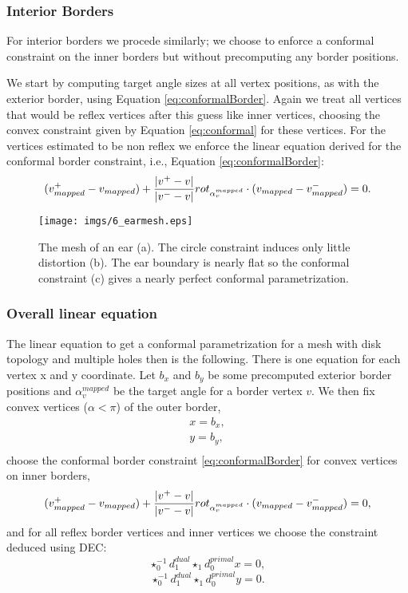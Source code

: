 \subsubsection{Interior Borders}
For interior borders we procede similarly; we choose to enforce a conformal constraint on the inner borders but without precomputing any border positions.

We start by computing target angle sizes at all vertex positions, as with the exterior border, using Equation \ref{eq:conformalBorder}. Again we treat all vertices that would be reflex vertices after this guess like inner vertices, choosing the convex constraint given by Equation \ref{eq:conformal} for these vertices.
For the vertices estimated to be non reflex we enforce the linear equation derived for the conformal border constraint, i.e., Equation \ref{eq:conformalBorder}:
\[(v^+_{mapped}-v_{mapped} ) + \frac{\left| v^+-v \right|}{\left| v^- -v \right|}rot_{\alpha_v^{mapped}} \cdot (v_{mapped} - v_{mapped}^- )= 0.\]

\begin{figure}%
\begin{center}
\texttt{[image: imgs/6\_earmesh.eps]}%
\end{center}
\caption{The mesh of an ear (a). The circle constraint induces only little distortion (b). The ear boundary is nearly flat so the conformal constraint (c) gives a nearly perfect conformal parametrization. }%
\label{fig:6_ear}%
\end{figure}

\subsubsection{Overall linear equation}
The linear equation to get a conformal parametrization for a mesh with disk topology and multiple holes then is the following.
There is one equation for each vertex x and y coordinate. Let $b_x$ and $b_y$ be some precomputed exterior border positions and $\alpha_v^{mapped}$ be the target angle for a border vertex $v$. We then fix convex vertices ($\alpha < \pi$) of the outer border,
\begin{eqnarray*}
 &x = b_x, & \\
 &y = b_y, &\\
\end{eqnarray*}
choose the conformal border constraint \ref{eq:conformalBorder} for convex vertices on inner borders, 
\[(v^+_{mapped}-v_{mapped} ) + \frac{\left| v^+-v \right|}{\left| v^- -v \right|}rot_{\alpha_v^{mapped}} \cdot (v_{mapped} - v_{mapped}^- )= 0,\]
and for all reflex border vertices and inner vertices we choose the constraint deduced using DEC:
\[\star_0^{-1} d_1^{dual} \star_1 d_0^{primal} x = 0,\]
\[\star_0^{-1} d_1^{dual} \star_1 d_0^{primal} y = 0.\]




